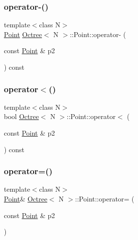 \mbox{\label{structOctree_1_1Point_a116fe11d8dfc0b06a803028c618a1449}} 
\subsubsection{\texorpdfstring{operator-\/()}{operator-()}}
{\footnotesize\ttfamily template$<$class N$>$ \\
\hyperlink{structOctree_1_1Point}{Point} \hyperlink{classOctree}{Octree}$<$ N $>$\+::Point\+::operator-\/ (\begin{DoxyParamCaption}\item[{const \hyperlink{structOctree_1_1Point}{Point} \&}]{p2 }\end{DoxyParamCaption}) const\hspace{0.3cm}{\ttfamily [inline]}}

\mbox{\label{structOctree_1_1Point_a5fb32b368c4540562b725b89e943a604}} 
\subsubsection{\texorpdfstring{operator$<$()}{operator<()}}
{\footnotesize\ttfamily template$<$class N$>$ \\
bool \hyperlink{classOctree}{Octree}$<$ N $>$\+::Point\+::operator$<$ (\begin{DoxyParamCaption}\item[{const \hyperlink{structOctree_1_1Point}{Point} \&}]{p2 }\end{DoxyParamCaption}) const\hspace{0.3cm}{\ttfamily [inline]}}

\mbox{\label{structOctree_1_1Point_a9e2960b98f3ac79776059cf246f0f59c}} 
\subsubsection{\texorpdfstring{operator=()}{operator=()}}
{\footnotesize\ttfamily template$<$class N$>$ \\
\hyperlink{structOctree_1_1Point}{Point}\& \hyperlink{classOctree}{Octree}$<$ N $>$\+::Point\+::operator= (\begin{DoxyParamCaption}\item[{const \hyperlink{structOctree_1_1Point}{Point} \&}]{p2 }\end{DoxyParamCaption})\hspace{0.3cm}{\ttfamily [inline]}}

